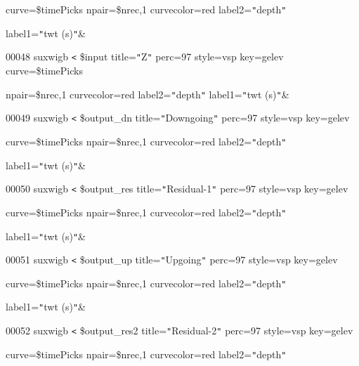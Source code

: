 \documentclass{article}
\begin{document}
\vspace{4pt}
curve=\$timePicks npair=\$nrec,1 curvecolor=red label2=\texttt{"}depth\texttt{"} 

\vspace{4pt}
label1=\texttt{"}twt (s)\texttt{"}\&

\vspace{4pt}
00048 suxwigb \texttt{<} \$input title=\texttt{"}Z\texttt{"} perc=97 style=vsp 
key=gelev curve=\$timePicks 

\vspace{4pt}
\parindent=18pt
npair=\$nrec,1 curvecolor=red label2=\texttt{"}depth\texttt{"} label1=\texttt{"}twt 
(s)\texttt{"}\&

\vspace{4pt}
\parindent=0pt
00049 suxwigb \texttt{<} \$output\_dn title=\texttt{"}Downgoing\texttt{"} perc=97 
style=vsp key=gelev 

\vspace{4pt}
\parindent=18pt
curve=\$timePicks npair=\$nrec,1 curvecolor=red label2=\texttt{"}depth\texttt{"} 

\vspace{4pt}
\parindent=0pt
label1=\texttt{"}twt (s)\texttt{"}\&

\vspace{4pt}
00050 suxwigb \texttt{<} \$output\_res title=\texttt{"}Residual-1\texttt{"} perc=97 
style=vsp key=gelev 

\vspace{4pt}
\parindent=18pt
curve=\$timePicks npair=\$nrec,1 curvecolor=red label2=\texttt{"}depth\texttt{"} 

\vspace{4pt}
\parindent=0pt
label1=\texttt{"}twt (s)\texttt{"}\&

\vspace{4pt}
00051 suxwigb \texttt{<} \$output\_up title=\texttt{"}Upgoing\texttt{"} perc=97 
style=vsp key=gelev 

\vspace{4pt}
\parindent=18pt
curve=\$timePicks npair=\$nrec,1 curvecolor=red label2=\texttt{"}depth\texttt{"} 

\vspace{4pt}
\parindent=0pt
label1=\texttt{"}twt (s)\texttt{"}\&

\vspace{4pt}
00052 suxwigb \texttt{<} \$output\_res2 title=\texttt{"}Residual-2\texttt{"} perc=97 
style=vsp key=gelev 

\vspace{4pt}
\parindent=18pt
curve=\$timePicks npair=\$nrec,1 curvecolor=red label2=\texttt{"}depth\texttt{"} 
\end{document}
